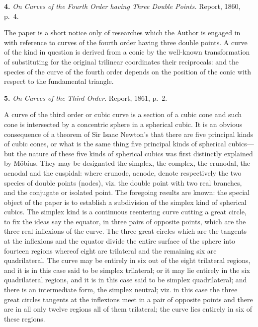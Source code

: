 \documentclass[11pt]{article}
\begin{document}
\medskip

\noindent\textbf{4.} \emph{On Curves of the Fourth Order having Three Double Points.} Report, 1860, p.~4.

\medskip

The paper is a short notice only of researches which the Author is engaged in with reference to curves of the fourth order having three double points. A curve of the kind in question is derived from a conic by the well-known transformation of substituting for the original trilinear coordinates their reciprocals: and the species of the curve of the fourth order depends on the position of the conic with respect to the fundamental triangle.

\medskip

\noindent\textbf{5.} \emph{On Curves of the Third Order.} Report, 1861, p.~2.

\medskip

A curve of the third order or cubic curve is a section of a cubic cone and such cone is intersected by a concentric sphere in a spherical cubic. It is an obvious consequence of a theorem of Sir Isaac Newton's that there are five principal kinds of cubic cones, or what is the same thing five principal kinds of spherical cubics---but the nature of these five kinds of spherical cubics was first distinctly explained by M\"obius. They may be designated the simplex, the complex, the crunodal, the acnodal and the cuspidal: where crunode, acnode, denote respectively the two species of double points (nodes), viz. the double point with two real branches, and the conjugate or isolated point. The foregoing results are known: the special object of the paper is to establish a subdivision of the simplex kind of spherical cubics. The simplex kind is a continuous reentering curve cutting a great circle, to fix the ideas say the equator, in three pairs of opposite points, which are the three real inflexions of the curve. The three great circles which are the tangents at the inflexions and the equator divide the entire surface of the sphere into fourteen regions whereof eight are trilateral and the remaining six are quadrilateral. The curve may be entirely in six out of the eight trilateral regions, and it is in this case said to be simplex trilateral; or it may lie entirely in the six quadrilateral regions, and it is in this case said to be simplex quadrilateral; and there is an intermediate form, the simplex neutral; viz. in this case the three great circles tangents at the inflexions meet in a pair of opposite points and there are in all only twelve regions all of them trilateral; the curve lies entirely in six of these regions.
\end{document}
